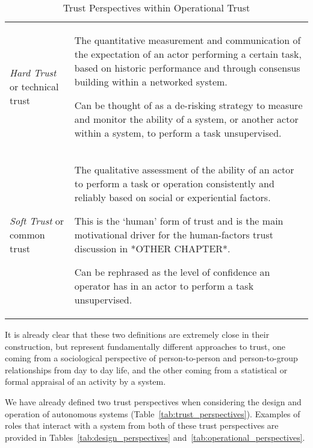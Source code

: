 \begin{table}
  \begin{tabularx}{\textwidth}{p{3cm}X}\toprule
    \emph{Hard Trust} or technical trust & The quantitative measurement and communication of the expectation of an actor performing a certain task, based on historic performance and through consensus building within a networked system.\par
    Can be thought of as a de-risking strategy to measure and monitor the ability of a system, or another actor within a system, to perform a task unsupervised.\\
    \emph{Soft Trust} or common trust & The qualitative assessment of the ability of an actor to perform a task or operation consistently and reliably based on social or experiential factors.\par
    This is the ‘human’ form of trust and is the main motivational driver for the human-factors trust discussion in *OTHER CHAPTER*.\par
    Can be rephrased as the level of confidence an operator has in an actor to perform a task unsupervised.\\
    \bottomrule
  \end{tabularx}
  \caption{Trust Perspectives within Operational Trust}
  \label{tab:operational_trust_perspectives}
\end{table}

It is already clear that these two definitions are extremely close in their construction, but represent fundamentally different approaches to trust, one coming from a sociological perspective of person-to-person and person-to-group relationships from day to day life, and the other coming from a statistical or formal appraisal of an activity by a system.

We have already defined two trust perspectives when considering the design and operation of autonomous systems (Table~\ref{tab:trust_perspectives}).
Examples of roles that interact with a system from both of these trust perspectives are provided in Tables~\ref{tab:design_perspectives} and~\ref{tab:operational_perspectives}.

